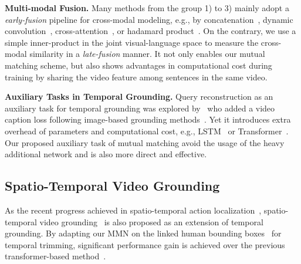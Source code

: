 \documentclass[letterpaper]{article} \usepackage{aaai22}  \usepackage{times}  \usepackage{helvet}  \usepackage{courier}  \usepackage[hyphens]{url}  \usepackage{graphicx} \urlstyle{rm} \def\UrlFont{\rm}  \usepackage{natbib}  \usepackage{caption} \DeclareCaptionStyle{ruled}{labelfont=normalfont,labelsep=colon,strut=off} \frenchspacing  \setlength{\pdfpagewidth}{8.5in}  \setlength{\pdfpageheight}{11in}  \usepackage{algorithm}
\begin{document}
\noindent\textbf{Multi-modal Fusion.} Many methods from the group 1) to 3) mainly adopt a {\em early-fusion} pipeline for cross-modal modeling, e.g., by concatenation~\cite{DBLP:conf/emnlp/ChenCMJC18,DBLP:journals/tip/LinZZZC20,DBLP:conf/aaai/Wang0J20}, dynamic convolution~\cite{DBLP:conf/wacv/OpazoMSLG20,DBLP:conf/cvpr/ZhangDWWD19,DBLP:conf/nips/YuanMWL019}, cross-attention~\cite{DBLP:conf/emnlp/LuCTLX19,DBLP:journals/corr/abs-2009-11232}, or hadamard product~\cite{DBLP:conf/cvpr/ZengXHCTG20,DBLP:conf/cvpr/MunCH20,DBLP:conf/aaai/ZhangPFL20}. On the contrary, we use a simple inner-product in the joint visual-language space to measure the cross-modal similarity in a {\em late-fusion} manner. It not only enables our mutual matching scheme, but also shows advantages in computational cost during training by sharing the video feature among sentences in the same video.

\noindent\textbf{Auxiliary Tasks in Temporal Grounding.} Query reconstruction as an auxiliary task for temporal grounding was explored by~\cite{DBLP:journals/tip/LinZZZC20,DBLP:conf/aaai/Xu0PSSS19} who added a video caption loss following image-based grounding methods~\cite{DBLP:conf/cvpr/RamanishkaDZS17}. Yet it introduces extra overhead of parameters and computational cost, e.g., LSTM~\cite{DBLP:conf/aaai/Xu0PSSS19} or Transformer~\cite{DBLP:journals/tip/LinZZZC20}. Our proposed auxiliary task of mutual matching avoid the usage of the heavy additional network and is also more direct and effective. 

\subsection{Spatio-Temporal Video Grounding}
As the recent progress achieved in spatio-temporal action localization~\cite{DBLP:conf/eccv/LiW0W20}, spatio-temporal video grounding~\cite{DBLP:journals/corr/abs-2011-05049} is also proposed as an extension of temporal grounding. By adapting our MMN on the linked human bounding boxes~\cite{DBLP:conf/iccv/KalogeitonWFS17a} for temporal trimming, significant performance gain is achieved over the previous transformer-based method~\cite{DBLP:journals/corr/abs-2011-05049}.
\end{document}
